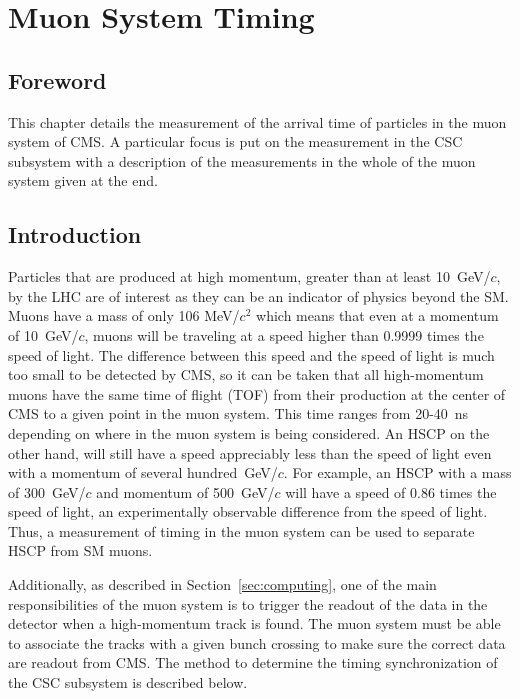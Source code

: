 \chapter{Muon System Timing \label{sec:timing}}

\section{Foreword}
This chapter details the measurement of the arrival time of particles in the muon system of CMS. A particular focus is put on the measurement in the CSC subsystem
with a description of the measurements in the whole of the muon system given at the end. 

\section{Introduction \label{sec:timingintro}}
Particles that are produced at high momentum, greater than at least 10~GeV/$c$, by the LHC are of interest as they can be an indicator of physics
beyond the SM. Muons have a mass of only 106 MeV/$c^2$ which means that even at a momentum of 10~GeV/$c$, muons will be traveling at a speed higher than 0.9999
times the speed of light. The difference between this speed and the speed of light is much too small to be detected by CMS, so it can be
taken that all high-momentum muons have the same time of flight (TOF) from their production at the center of CMS to a given point in the muon system.
This time ranges from 20-40~ns depending on where in the muon system is being considered. An HSCP on the other hand, will still have a speed appreciably less than the speed
of light even with a momentum of several hundred~GeV/$c$. For example, an HSCP with a mass of 300~GeV/$c$ and momentum of 500~GeV/$c$ will have a speed of
0.86 times the speed of light, an experimentally observable difference from the speed of light.
Thus, a measurement of timing in the muon system can be used to separate HSCP from SM muons.

Additionally, as described in Section~\ref{sec:computing}, one of the main responsibilities  of the muon system is to trigger the readout of the data in the detector
when a high-momentum track is found. The muon system must be able to associate the tracks with a given bunch crossing to make sure the correct data are readout from CMS.
The method to determine the timing synchronization of the CSC subsystem is described below.

